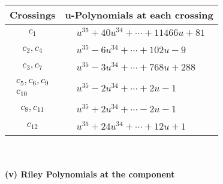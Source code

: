 \documentclass[1p]{elsarticle_modified}
\theoremstyle{definition}
\begin{document}
\begin{tabular}{m{50pt}|m{274pt}}
Crossings & \hspace{64pt}u-Polynomials at each crossing \\
\hline $$\begin{aligned}c_{1}\end{aligned}$$&$\begin{aligned}
&u^{35}+40 u^{34}+\cdots+11466 u+81
\end{aligned}$\\
\hline $$\begin{aligned}c_{2},c_{4}\end{aligned}$$&$\begin{aligned}
&u^{35}-6 u^{34}+\cdots+102 u-9
\end{aligned}$\\
\hline $$\begin{aligned}c_{3},c_{7}\end{aligned}$$&$\begin{aligned}
&u^{35}-3 u^{34}+\cdots+768 u+288
\end{aligned}$\\
\hline $$\begin{aligned}c_{5},c_{6},c_{9}\\c_{10}\end{aligned}$$&$\begin{aligned}
&u^{35}-2 u^{34}+\cdots+2 u-1
\end{aligned}$\\
\hline $$\begin{aligned}c_{8},c_{11}\end{aligned}$$&$\begin{aligned}
&u^{35}+2 u^{34}+\cdots-2 u-1
\end{aligned}$\\
\hline $$\begin{aligned}c_{12}\end{aligned}$$&$\begin{aligned}
&u^{35}+24 u^{34}+\cdots+12 u+1
\end{aligned}$\\
\hline
\end{tabular}\\~\\
\newpage\renewcommand{\arraystretch}{1}
\flushleft \textbf{(v) Riley Polynomials at the component}\newline \\
\end{document}
